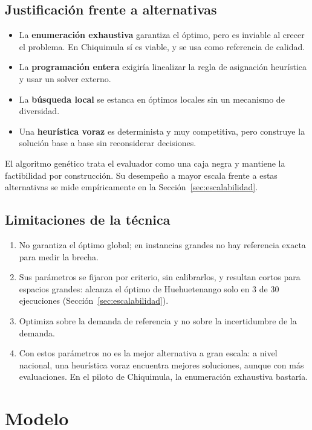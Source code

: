 \documentclass[11pt,letterpaper]{article}
\begin{document}
\subsection{Justificación frente a alternativas}

\begin{itemize}
  \item La \textbf{enumeración exhaustiva} garantiza el óptimo, pero es inviable al crecer el problema. En Chiquimula sí es viable, y se usa como referencia de calidad.
  \item La \textbf{programación entera} exigiría linealizar la regla de asignación heurística y usar un solver externo.
  \item La \textbf{búsqueda local} se estanca en óptimos locales sin un mecanismo de diversidad.
  \item Una \textbf{heurística voraz} es determinista y muy competitiva, pero construye la solución base a base sin reconsiderar decisiones.
\end{itemize}
El algoritmo genético trata el evaluador como una caja negra y mantiene la factibilidad por construcción. Su desempeño a mayor escala frente a estas alternativas se mide empíricamente en la Sección~\ref{sec:escalabilidad}.

\subsection{Limitaciones de la técnica}

\begin{enumerate}[nosep]
  \item No garantiza el óptimo global; en instancias grandes no hay referencia exacta para medir la brecha.
  \item Sus parámetros se fijaron por criterio, sin calibrarlos, y resultan cortos para espacios grandes: alcanza el óptimo de Huehuetenango solo en 3 de 30 ejecuciones (Sección~\ref{sec:escalabilidad}).
  \item Optimiza sobre la demanda de referencia y no sobre la incertidumbre de la demanda.
  \item Con estos parámetros no es la mejor alternativa a gran escala: a nivel nacional, una heurística voraz encuentra mejores soluciones, aunque con más evaluaciones. En el piloto de Chiquimula, la enumeración exhaustiva bastaría.
\end{enumerate}

\section{Modelo}
\label{sec:modelo}
\end{document}
